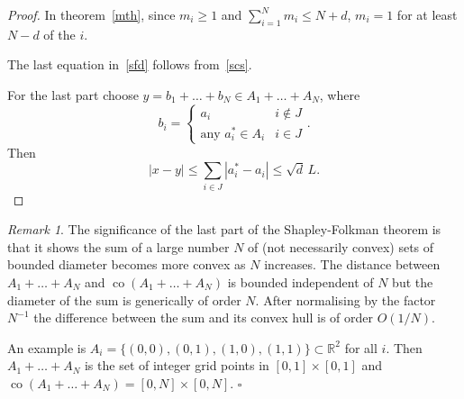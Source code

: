 \documentclass[a4paper]{amsart}
\theoremstyle{plain}
\theoremstyle{definition}
\theoremstyle{remark}
\newtheorem{remark}[theorem]{Remark}
\DeclareMathOperator{\co}{co}
\begin{document}
\begin{proof} In theorem~\ref{mth}, since $ m_i \geq 1 $ and   $ \sum_{i=1}^N m_i \leq N + d $, $ m_i = 1 $ for at least $ N- d $ of the $ i $.  

The last equation in~\eqref{sfd} follows from~\eqref{scs}. 

\medskip For the last part choose $ y = b_1 + \dots +   b_N \in A_1 + \dots + A_N $, where 
\[
b_i = \begin{cases} a_i   & i \notin J \\  \text{any } a_i^*\in A_i  & i \in J \end{cases}.
\]
Then
\[
|x-y| \leq \sum_{i\in J} |a_i^* - a_i| \leq \sqrt{d}\, L .
\]
\end{proof}

\begin{remark} The significance of the last part of the Shapley-Folkman theorem is that it shows the sum of a large number $ N $ of (not necessarily convex) sets of bounded diameter becomes more convex as $ N $ increases.  The distance between $ A_1 + \dots + A_N  $  and $ \co (A_1 + \dots + A_N) $   is bounded independent of $ N $ but the diameter of the sum is generically of   order $ N $.  After normalising by the factor $ N^{-1} $ the difference between the sum and its convex hull is of order $ O(1/N) $.

An example is $ A_i = \{ (0,0), (0,1), (1,0), (1,1)\} \subset \mathbb{R}^2 $ for all $ i $.  Then $ A_1 + \dots + A_N  $ is the set of integer grid points in $ [0,1]\times [0,1] $ and $ \co (A_1 + \dots + A_N)  =  [0,N]\times [0,N] $.
\hfill $\square$  \end{remark} 
\end{document}
